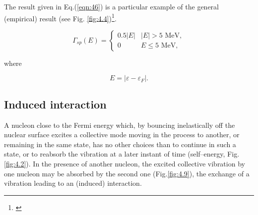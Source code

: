 The result given in Eq.(\ref{eqn:46}) is a particular example of the general (empirical) result (see Fig. \ref{fig:4.4})\footnote{\cite{Bertsch:83}}.

\begin{equation}
\Gamma_{sp} (E) =
  \begin{cases}
    0.5 |E| & \text{$|E|>5$ MeV}, \\
    0     & \text{$E \leq 5$ MeV},
  \end{cases}
\label{eqn:47}
\end{equation}

\noindent where

\begin{equation}
E = |\varepsilon - \varepsilon_F| .
\label{eqn:48}
\end{equation}

\subsection{Induced interaction}

A nucleon close to the Fermi energy which, by bouncing inelastically off the nuclear surface excites a collective mode moving in the process to another, or remaining in the same state, has no other choices than to continue in such a state, or to reabsorb the vibration at a later instant of time (self--energy, Fig. \ref{fig:4.2}). In the presence of another nucleon, the excited  collective vibration  by one nucleon may be absorbed by the second one (Fig.\ref{fig:4.9}), the exchange of a vibration leading to an (induced) interaction.

